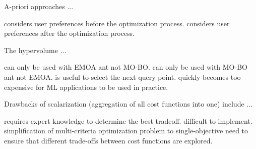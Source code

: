 \documentclass{exam}
\begin{document}
\begin{questions}
\question A-priori approaches ...
\begin{choices}
    \choice considers user preferences before the optimization process. %
    \choice considers user preferences after the optimization process.
\end{choices}

\question The hypervolume ...
\begin{choices}
    \choice can only be used with EMOA ant not MO-BO.
    \choice can only be used with MO-BO ant not EMOA.
    \choice is useful to select the next query point. %
    \choice quickly becomes too expensive for ML applications to be used in practice.
\end{choices}

\question Drawbacks of scalarization (aggregation of all cost functions into one) include ...
\begin{choices}
    \choice requires expert knowledge to determine the best tradeoff. %
    \choice difficult to implement.
    \choice simplification of multi-criteria optimization problem to single-objective
    \choice need to ensure that different trade-offs
between cost functions are explored. %
\end{choices}		
	\end{questions}
\end{document}
